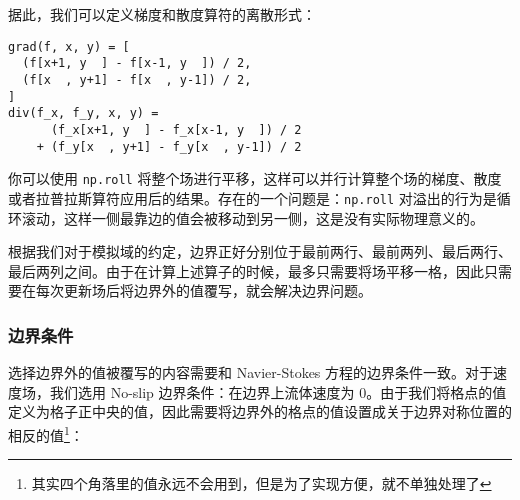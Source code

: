 \documentclass{ctexart}
\begin{document}
据此，我们可以定义梯度和散度算符的离散形式：

\begin{verbatim}
grad(f, x, y) = [
  (f[x+1, y  ] - f[x-1, y  ]) / 2,
  (f[x  , y+1] - f[x  , y-1]) / 2,
]
div(f_x, f_y, x, y) =
      (f_x[x+1, y  ] - f_x[x-1, y  ]) / 2
    + (f_y[x  , y+1] - f_y[x  , y-1]) / 2
\end{verbatim}

你可以使用 \texttt{np.roll} 将整个场进行平移，这样可以并行计算整个场的梯度、散度或者拉普拉斯算符应用后的结果。存在的一个问题是：\texttt{np.roll} 对溢出的行为是循环滚动，这样一侧最靠边的值会被移动到另一侧，这是没有实际物理意义的。

根据我们对于模拟域的约定，边界正好分别位于最前两行、最前两列、最后两行、最后两列之间。由于在计算上述算子的时候，最多只需要将场平移一格，因此只需要在每次更新场后将边界外的值覆写，就会解决边界问题。

\subsubsection{边界条件}

选择边界外的值被覆写的内容需要和 Navier-Stokes 方程的边界条件一致。对于速度场，我们选用 No-slip 边界条件：在边界上流体速度为 0。由于我们将格点的值定义为格子正中央的值，因此需要将边界外的格点的值设置成关于边界对称位置的相反的值\footnote{其实四个角落里的值永远不会用到，但是为了实现方便，就不单独处理了}：
\end{document}
